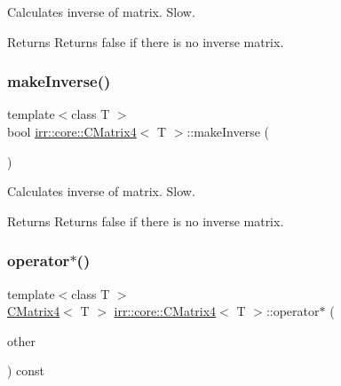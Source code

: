 Calculates inverse of matrix. Slow. 

\begin{DoxyReturn}{Returns}
Returns false if there is no inverse matrix. 
\end{DoxyReturn}
\mbox{\label{classirr_1_1core_1_1CMatrix4_a3fbface2cb6b959af64f82a5bb17540e}} 
\subsubsection{\texorpdfstring{make\+Inverse()}{makeInverse()}\hspace{0.1cm}{\footnotesize\ttfamily [2/2]}}
{\footnotesize\ttfamily template$<$class T $>$ \\
bool \hyperlink{classirr_1_1core_1_1CMatrix4}{irr\+::core\+::\+C\+Matrix4}$<$ T $>$\+::make\+Inverse (\begin{DoxyParamCaption}{ }\end{DoxyParamCaption})\hspace{0.3cm}{\ttfamily [inline]}}



Calculates inverse of matrix. Slow. 

\begin{DoxyReturn}{Returns}
Returns false if there is no inverse matrix. 
\end{DoxyReturn}
\mbox{\label{classirr_1_1core_1_1CMatrix4_af5ecb6176941d57716bb800963042183}} 
\subsubsection{\texorpdfstring{operator$\ast$()}{operator*()}\hspace{0.1cm}{\footnotesize\ttfamily [1/2]}}
{\footnotesize\ttfamily template$<$class T $>$ \\
\hyperlink{classirr_1_1core_1_1CMatrix4}{C\+Matrix4}$<$ T $>$ \hyperlink{classirr_1_1core_1_1CMatrix4}{irr\+::core\+::\+C\+Matrix4}$<$ T $>$\+::operator$\ast$ (\begin{DoxyParamCaption}\item[{const \hyperlink{classirr_1_1core_1_1CMatrix4}{C\+Matrix4}$<$ T $>$ \&}]{other }\end{DoxyParamCaption}) const\hspace{0.3cm}{\ttfamily [inline]}}



